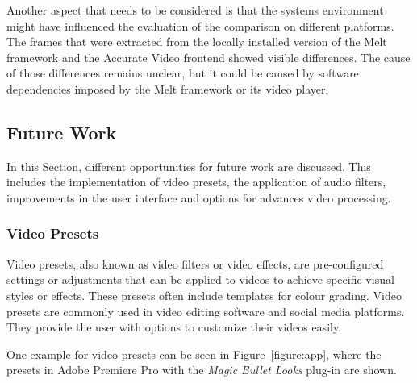 \documentclass[../MasterThesis.tex]{subfiles}
\begin{document}
Another aspect that needs to be considered is that the systems environment might have influenced the evaluation of the comparison on different platforms. The frames that were extracted from the locally installed version of the Melt framework and the Accurate Video frontend showed visible differences. The cause of those differences remains unclear, but it could be caused by software dependencies imposed by the Melt framework or its video player.

	

	
	
	
	





\subsection{Future Work} \label{subsection:futurework}


In this Section, different opportunities for future work are discussed. This includes the implementation of video presets, the application of audio filters, improvements in the user interface and options for advances video processing.


\subsubsection*{Video Presets}

Video presets, also known as video filters or video effects, are pre-configured settings or adjustments that can be applied to videos to achieve specific visual styles or effects. 
These presets often include templates for colour grading. 
Video presets are commonly used in video editing software and social media platforms. They provide the user with options to customize their videos easily. 

One example for video presets can be seen in Figure~\ref{figure:app}, where the presets in Adobe Premiere Pro with the \textit{Magic Bullet Looks} plug-in are shown.~\cite{premierepro, magicbullet}
\end{document}
